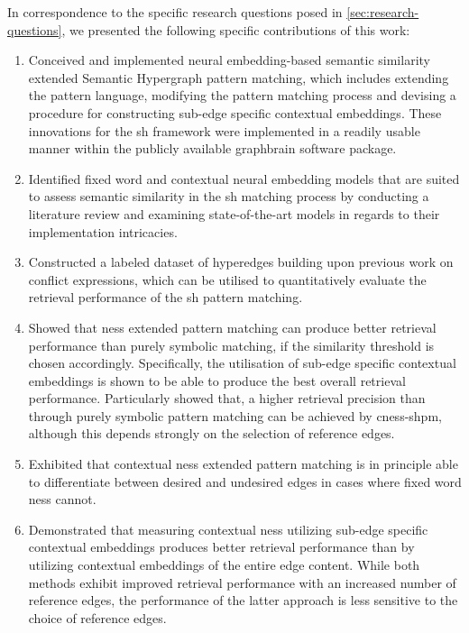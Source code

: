 \documentclass[11pt, numbers=noenddot]{scrreprt}
\begin{document}
In correspondence to the specific research questions posed in \cref{sec:research-questions}, we presented the following specific  contributions of this work:

\begin{enumerate}[label=\textbf{C.\arabic*}, leftmargin=0pt, labelwidth=*, align=left, labelsep=0.5em, itemindent=0pt, listparindent=\parindent]
\item Conceived and implemented neural embedding-based semantic similarity extended Semantic Hypergraph pattern matching, which includes extending the pattern language, modifying the pattern matching process and devising a procedure for constructing sub-edge specific contextual embeddings. These innovations for the \gls{sh} framework were implemented in a readily usable manner within the publicly available graphbrain software package.

\item Identified fixed word and contextual neural embedding models that are suited to assess semantic similarity in the \gls{sh} matching process by conducting a literature review and examining state-of-the-art models in regards to their implementation intricacies. 

\item Constructed a labeled dataset of hyperedges building upon previous work on conflict expressions, which can be utilised to quantitatively evaluate the retrieval performance of the \gls{sh} pattern matching.

\item Showed that \gls{ness} extended pattern matching can produce better retrieval performance than purely symbolic matching, if the similarity threshold is chosen accordingly. Specifically, the utilisation of sub-edge specific contextual embeddings is shown to be able to produce the best overall retrieval performance. Particularly showed that, a higher retrieval precision than through purely symbolic pattern matching can be achieved by \gls{cness-shpm}, although this depends strongly on the selection of reference edges.

\item Exhibited that contextual \gls{ness} extended pattern matching is in principle able to differentiate between desired and undesired edges in cases where fixed word \gls{ness} cannot.

\item Demonstrated that measuring contextual \gls{ness} utilizing sub-edge specific contextual embeddings produces better retrieval performance than by utilizing contextual embeddings of the entire edge content. While both methods exhibit improved retrieval performance with an increased number of reference edges, the performance of the latter approach is less sensitive to the choice of reference edges.


\end{enumerate}
\end{document}
